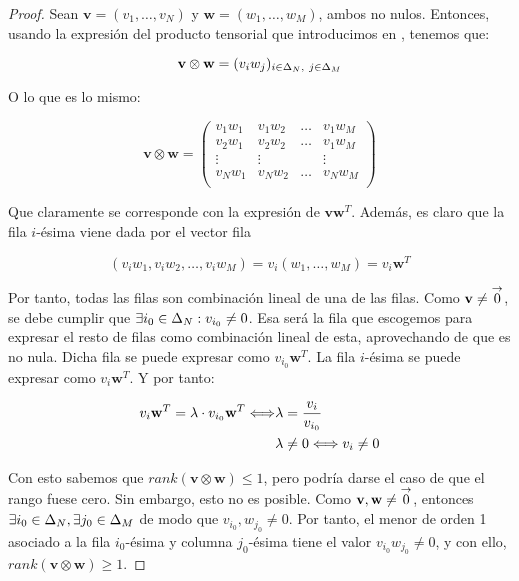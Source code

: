 \begin{proof}

Sean $\mathbf{v} = (v_1, \ldots, v_N)$ y $\mathbf{w} = (w_1, \ldots, w_M)$, ambos no nulos. Entonces, usando la expresión del producto tensorial que introducimos en , tenemos que:

\begin{equation}
    \mathbf{v} \otimes \mathbf{w} = (v_i w_j)_{i \in \Delta_{N},\ j \in \Delta_{M}}
\end{equation}

O lo que es lo mismo:

\begin{equation}
    \mathbf{v} \otimes \mathbf{w} = \begin{pmatrix}
        v_1 w_1 & v_1 w_2 & \ldots & v_1 w_M \\
        v_2 w_1 & v_2 w_2 & \ldots & v_1 w_M \\
        \vdots  & \vdots & & \vdots \\
        v_N w_1 & v_N w_2 & \ldots & v_N w_M \\
    \end{pmatrix}
\end{equation}

Que claramente se corresponde con la expresión de $\mathbf{v} \mathbf{w}^T$. Además, es claro que la fila $i$-ésima viene dada por el vector fila

$$(v_i w_1, v_i w_2, \ldots, v_i w_M) = v_i (w_1, \ldots, w_M) = v_i \mathbf{w}^T$$

Por tanto, todas las filas son combinación lineal de una de las filas. Como $\mathbf{v} \neq \overset{\to}{0}$, se debe cumplir que $\exists i_0 \in \Delta_{N}: v_{i_0} \neq 0$. Esa será la fila que escogemos para expresar el resto de filas como combinación lineal de esta, aprovechando de que es no nula. Dicha fila se puede expresar como $v_{i_0} \mathbf{w}^T$. La fila $i$-ésima se puede expresar como $v_i \mathbf{w}^T$. Y por tanto:

\begin{equation}
\begin{split}
    v_i \mathbf{w}^T = \lambda \cdot v_{i_0} \mathbf{w}^T \Longleftrightarrow & \lambda = \frac{v_i}{v_{i_0}} \\
    & \lambda \neq 0 \Longleftrightarrow v_i \neq 0
\end{split}
\end{equation}

Con esto sabemos que $rank(\mathbf{v} \otimes \mathbf{w}) \leq 1$, pero podría darse el caso de que el rango fuese cero. Sin embargo, esto no es posible. Como $\mathbf{v}, \mathbf{w} \neq \overset{\to}{0}$, entonces $\exists i_0 \in \Delta_{N}, \exists j_0 \in \Delta_{M}$ de modo que $v_{i_0}, w_{j_0} \neq 0$. Por tanto, el menor de orden 1 asociado a la fila $i_0$-ésima y columna $j_0$-ésima tiene el valor $v_{i_0} w_{j_0} \neq 0$, y con ello, $rank(\mathbf{v} \otimes \mathbf{w}) \geq 1$.

\end{proof}

